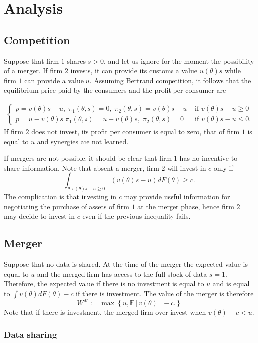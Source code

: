 \documentclass[a4paper,leqno]{article}%
\newcommand{\E}{\mathbb E}
\renewcommand{\t}{\theta}
\begin{document}
\section{Analysis}

\subsection{Competition}

Suppose that firm $1$ shares $s>0$, and let us ignore for the moment the possibility of a merger. If firm $2$ invests, it can provide its customs a value $u(\t)s$ while firm $1$ can provide a value $u$. Assuming Bertrand competition, it follows that the equilibrium price paid by the consumers and the profit per consumer are

\begin{align}\label{comp}
\begin{cases}
    p=v(\t)s-u,\; \pi_1(\t,s)=0,\; \pi_2(\t,s)=v(\t)s-u & \text{ if }v(\t)s-u\geq 0\\ 
    p=u-v(\t)s\; \pi_1(\t,s)=u-v(\t)s,\; \pi_2(\t,s)=0 & \text{ if }v(\t)s-u\leq 0.
\end{cases}
\end{align}
If firm $2$ does not invest, its profit per consumer is equal to zero, that of firm $1$ is equal to $u$ and synergies are not learned.

If mergers are not possible, it should be clear that firm $1$ has no incentive to share information. Note that absent a merger, firm $2$ will invest in $c$ only if 
%
\[
\int_{\t:v(\t)s-u\geq 0}(v(\t)s-u) dF(\t)\geq c.
\]
The complication is that investing in $c$ may provide useful information for negotiating the purchase of assets of firm $1$ at the merger phase, hence firm $2$ may decide to invest in $c$ even if the previous inequality fails.

\subsection{Merger}
%
Suppose that no data is shared. At the time of the merger the expected value is equal to $u$ and the merged firm has access to the full stock of data $s=1$. Therefore, the expected value if there is no investment is equal to $u$ and is equal to $\int v(\t)dF(\t)-c$ if there is investment. The value of the merger is therefore
%
\[
W^M:=\max\left\{u,\E[v(\t)]-c.\right\}
\]
%
Note that if there is investment, the merged firm over-invest when $v(\t)-c<u$.

\subsubsection{Data sharing}
\end{document}
